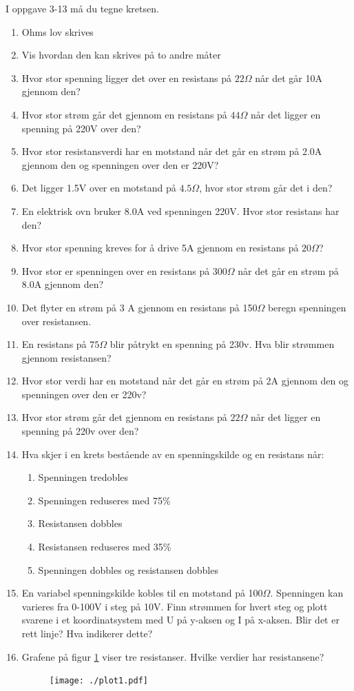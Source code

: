 \documentclass[12pt,a4paper]{article}
\begin{document}
I oppgave 3-13 må du tegne kretsen. 
\begin{enumerate}
\item Ohms lov skrives 
\item Vis hvordan den kan skrives på to andre måter
\item Hvor stor spenning ligger det over en resistans på $22\Omega$ når
det går 10A gjennom den?
\item Hvor stor strøm går det gjennom en resistans på $44\Omega$ når det
ligger en spenning på 220V over den?
\item Hvor stor resistansverdi har en motstand når det går en strøm på 2.0A
gjennom den og spenningen over den er 220V?
\item Det ligger 1.5V over en motstand på $4.5\Omega$, hvor stor strøm
går det i den?
\item En elektrisk ovn bruker 8.0A ved spenningen 220V. Hvor stor resistans
har den?
\item Hvor stor spenning kreves for å drive 5A gjennom en resistans på $20\Omega$? 
\item Hvor stor er spenningen over en resistans på $300\Omega$ når det
går en strøm på 8.0A gjennom den?
\item Det flyter en strøm på 3 A gjennom en resistans på 150$\Omega$ beregn
spenningen over resistansen. 
\item En resistans på $75\Omega$ blir påtrykt en spenning på 230v. Hva
blir strømmen gjennom resistansen? 
\item Hvor stor verdi har en motstand når det går en strøm på 2A gjennom
den og spenningen over den er 220v? 
\item Hvor stor strøm går det gjennom en resistans på $22\Omega$ når det
ligger en spenning på 220v over den? 
\item Hva skjer i en krets bestående av en spenningskilde og en resistans
når:

\begin{enumerate}
\item Spenningen tredobles
\item Spenningen reduseres med 75\%
\item Resistansen dobbles
\item Resistansen reduseres med 35\%
\item Spenningen dobbles og resistansen dobbles
\end{enumerate}
\item En variabel spenningskilde kobles til en motstand på 100$\Omega$.
Spenningen kan varieres fra 0-100V i steg på 10V. Finn strømmen for
hvert steg og plott svarene i et koordinatsystem med U på y-aksen
og I på x-aksen. Blir det er rett linje? Hva indikerer dette?
\item Grafene på figur \ref{fig:-1-1} viser tre resistanser. Hvilke verdier
har resistansene?\\
\begin{figure}[H]
\noindent \begin{centering}
\texttt{[image: ./plot1.pdf]}
\par\end{centering}
\caption{\label{fig:-1-1}}
\end{figure}
\end{enumerate}
\end{document}
